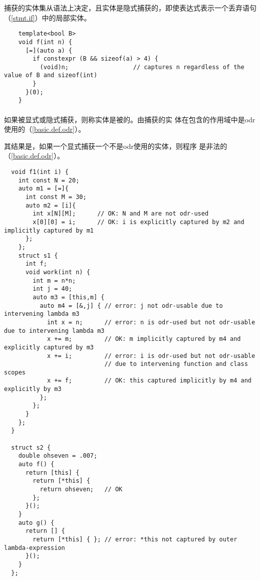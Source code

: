 \begin{note}
  捕获的实体集从语法上决定，且实体是隐式捕获的，即使表达式表示一个丢弃语句
  （\ref{stmt.if}）中的局部实体。

  \newpage
  \begin{example}
    \begin{lstlisting}
    template<bool B>
    void f(int n) {
      [=](auto a) {
        if constexpr (B && sizeof(a) > 4) {
          (void)n;                  // captures n regardless of the value of B and sizeof(int)
        }
      }(0);
    }
    \end{lstlisting}
  \end{example}

\end{note}

\paragraph{} %
如果被显式或隐式捕获，则称实体是被的。由捕获的实
体在包含的作用域中是odr使用的（\ref{basic.def.odr}）。

\begin{note}
  其结果是，如果一个显式捕获一个不是odr使用的实体，则程序
  是非法的（\ref{basic.def.odr}）。
\end{note}

\begin{example}
  \begin{lstlisting}
  void f1(int i) {
    int const N = 20;
    auto m1 = [=]{
      int const M = 30;
      auto m2 = [i]{
        int x[N][M];      // OK: N and M are not odr-used
        x[0][0] = i;      // OK: i is explicitly captured by m2 and implicitly captured by m1
      };
    };
    struct s1 {
      int f;
      void work(int n) {
        int m = n*n;
        int j = 40;
        auto m3 = [this,m] {
          auto m4 = [&,j] { // error: j not odr-usable due to intervening lambda m3
            int x = n;      // error: n is odr-used but not odr-usable due to intervening lambda m3
            x += m;         // OK: m implicitly captured by m4 and explicitly captured by m3
            x += i;         // error: i is odr-used but not odr-usable
                            // due to intervening function and class scopes
            x += f;         // OK: this captured implicitly by m4 and explicitly by m3
          };
        };
      }
    };
  }

  struct s2 {
    double ohseven = .007;
    auto f() {
      return [this] {
        return [*this] {
          return ohseven;   // OK
        };
      }();
    }
    auto g() {
      return [] {
        return [*this] { }; // error: *this not captured by outer lambda-expression
      }();
    }
  };
  \end{lstlisting}
\end{example}


